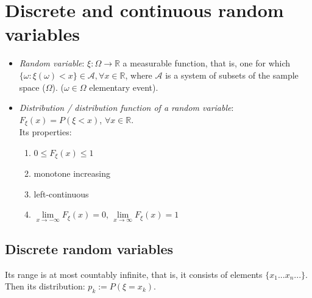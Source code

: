 \documentclass[margin=0px]{article}
\begin{document}
\section{Discrete and continuous random variables}

\begin{itemize}
    \item \textit{Random variable}: $\xi : \Omega \to \mathbb{R}$ a measurable function, that is, one for which $\{\omega : \xi(\omega) < x\} \in \mathcal{A}, \forall x \in \mathbb{R}$, where $\mathcal{A}$ is a system of subsets of the sample space ($\Omega$). ($\omega \in \Omega$ elementary event).
    \item \textit{Distribution / distribution function of a random variable}: $F_{\xi}(x) = P(\xi < x)$, $\forall x \in \mathbb{R}$. \\
          Its properties:
          \begin{enumerate}
              \item $0 \leq F_{\xi}(x) \leq 1$
              \item monotone increasing
              \item left-continuous
              \item $\lim\limits_{x \to -\infty}{F_{\xi}(x)} = 0$, $\lim\limits_{x \to \infty}{F_{\xi}(x)} = 1$
          \end{enumerate}
\end{itemize}

\subsection{Discrete random variables}

Its range is at most countably infinite, that is, it consists of elements $\{x_1 ... x_n ... \}$. Then its distribution: $p_k := P(\xi = x_k)$.
\end{document}
